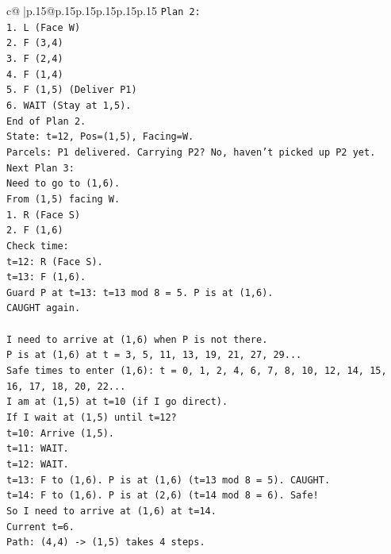 \documentclass{article}
\begin{document}
{\begin{supertabular}{c@{$\;$}|p{.15\linewidth}@{}p{.15\linewidth}p{.15\linewidth}p{.15\linewidth}p{.15\linewidth}p{.15\linewidth}}
{{{\texttt{Plan 2:} \\
\texttt{1. L (Face W)} \\
\texttt{2. F (3,4)} \\
\texttt{3. F (2,4)} \\
\texttt{4. F (1,4)} \\
\texttt{5. F (1,5) (Deliver P1)} \\
\texttt{6. WAIT (Stay at 1,5).} \\
\texttt{End of Plan 2.} \\
\texttt{State: t=12, Pos=(1,5), Facing=W.} \\
\texttt{Parcels: P1 delivered. Carrying P2? No, haven't picked up P2 yet.} \\
\texttt{Next Plan 3:} \\
\texttt{Need to go to (1,6).} \\
\texttt{From (1,5) facing W.} \\
\texttt{1. R (Face S)} \\
\texttt{2. F (1,6)} \\
\texttt{Check time:} \\
\texttt{t=12: R (Face S).} \\
\texttt{t=13: F (1,6).} \\
\texttt{Guard P at t=13: t=13 mod 8 = 5. P is at (1,6).} \\
\texttt{CAUGHT again.} \\
\\ 
\texttt{I need to arrive at (1,6) when P is not there.} \\
\texttt{P is at (1,6) at t = 3, 5, 11, 13, 19, 21, 27, 29...} \\
\texttt{Safe times to enter (1,6): t = 0, 1, 2, 4, 6, 7, 8, 10, 12, 14, 15, 16, 17, 18, 20, 22...} \\
\texttt{I am at (1,5) at t=10 (if I go direct).} \\
\texttt{If I wait at (1,5) until t=12?} \\
\texttt{t=10: Arrive (1,5).} \\
\texttt{t=11: WAIT.} \\
\texttt{t=12: WAIT.} \\
\texttt{t=13: F to (1,6). P is at (1,6) (t=13 mod 8 = 5). CAUGHT.} \\
\texttt{t=14: F to (1,6). P is at (2,6) (t=14 mod 8 = 6). Safe!} \\
\texttt{So I need to arrive at (1,6) at t=14.} \\
\texttt{Current t=6.} \\
\texttt{Path: (4,4) {-}> (1,5) takes 4 steps.} \\
}}}
\end{supertabular}}
\end{document}
